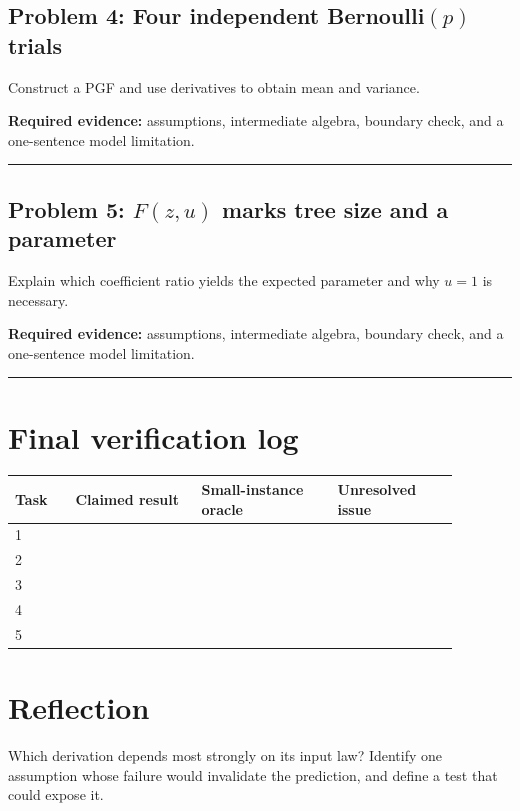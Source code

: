 \documentclass[11pt]{article}
\begin{document}
\subsection{\texorpdfstring{Problem 4: Four independent Bernoulli$(p)$ trials}{Problem 4: Four independent Bernoulli(p) trials}}
Construct a PGF and use derivatives to obtain mean and variance.\par
\textbf{Required evidence:} assumptions, intermediate algebra, boundary check, and a one-sentence model limitation.\par
\vspace{1.2cm}\hrule\vspace{0.4cm}
\subsection{\texorpdfstring{Problem 5: $F(z,u)$ marks tree size and a parameter}{Problem 5: Bivariate generating function F(z,u) marking tree size and a parameter}}
Explain which coefficient ratio yields the expected parameter and why $u=1$ is necessary.\par
\textbf{Required evidence:} assumptions, intermediate algebra, boundary check, and a one-sentence model limitation.\par
\vspace{1.2cm}\hrule\vspace{0.4cm}
\section{Final verification log}
\begin{longtable}{p{0.12\linewidth}p{0.25\linewidth}p{0.27\linewidth}p{0.24\linewidth}}\toprule Task & Claimed result & Small-instance oracle & Unresolved issue \\ \midrule
1 & & & \\ 2 & & & \\ 3 & & & \\ 4 & & & \\ 5 & & & \\ \bottomrule\end{longtable}
\section{Reflection}
Which derivation depends most strongly on its input law? Identify one assumption whose failure would invalidate the prediction, and define a test that could expose it.
\end{document}
